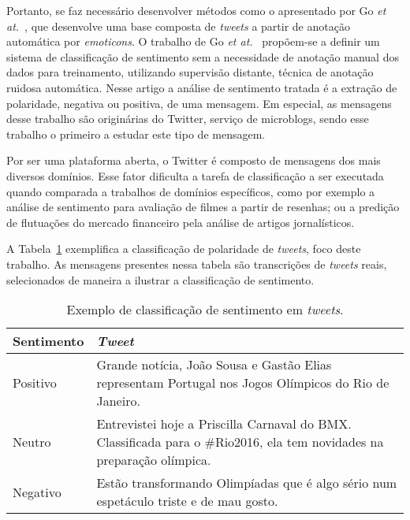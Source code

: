 Portanto, se faz necessário desenvolver métodos como o apresentado por Go \textit{et at.}~\cite{go09}, que desenvolve
uma base composta de \textit{tweets} a partir de anotação automática por \textit{emoticons}.
O trabalho de Go \textit{et at.}~\cite{go09} propõem-se a definir um sistema de classificação de sentimento sem a
necessidade de anotação manual dos dados para treinamento, utilizando supervisão distante, técnica de anotação ruidosa
automática.
Nesse artigo a análise de sentimento tratada é a extração de polaridade, negativa ou positiva, de uma mensagem.
Em especial, as mensagens desse trabalho são originárias do Twitter, serviço de microblogs, sendo esse trabalho o
primeiro a estudar este tipo de mensagem.

Por ser uma plataforma aberta, o Twitter é composto de mensagens dos mais diversos domínios.
Esse fator dificulta a tarefa de classificação a ser executada quando comparada a trabalhos de domínios específicos,
como por exemplo a análise de sentimento para avaliação de filmes a partir de resenhas; ou a predição de flutuações do
mercado financeiro pela análise de artigos jornalísticos.

A Tabela~\ref{tab:sentiment} exemplifica a classificação de polaridade de \textit{tweets}, foco deste trabalho.
As mensagens presentes nessa tabela são transcrições de \textit{tweets} reais, selecionados de maneira a ilustrar
a classificação de sentimento.

\begin{table}[h]
    \begin{center}
        \begin{tabular}{| l | p{10cm} |}
        \hline
        \textbf{Sentimento} & \textbf{\textit{Tweet}} \\ \hline
        Positivo & Grande notícia, João Sousa e Gastão Elias representam Portugal nos Jogos Olímpicos do Rio de Janeiro.
        \\ \hline
        Neutro & Entrevistei hoje a Priscilla Carnaval do BMX. Classificada para o \#Rio2016, ela tem novidades na
        preparação olímpica. \\ \hline
        Negativo & Estão transformando Olimpíadas que é algo sério num espetáculo triste e de mau gosto. \\ \hline
        \end{tabular}
        \caption{Exemplo de classificação de sentimento em \textit{tweets}.}
        \label{tab:sentiment}
    \end{center}
\end{table}

